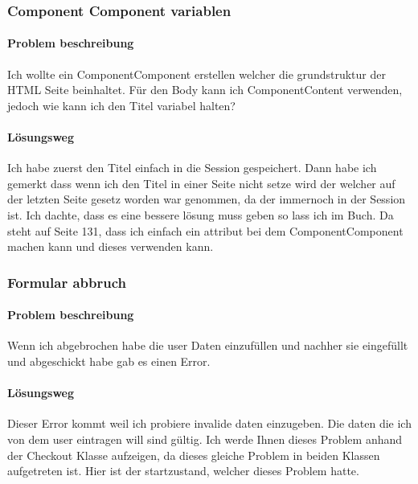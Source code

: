 \documentclass[a4paper, 11pt]{article}
\begin{document}
\subsubsection{Component Component variablen}

\paragraph{Problem beschreibung}

Ich wollte ein ComponentComponent erstellen welcher die grundstruktur der HTML Seite beinhaltet.
Für den Body kann ich ComponentContent verwenden, jedoch wie kann ich den Titel variabel halten?

\paragraph{Lösungsweg}

Ich habe zuerst den Titel einfach in die Session gespeichert.
Dann habe ich gemerkt dass wenn ich den Titel in einer Seite nicht setze wird der welcher auf der letzten Seite gesetz worden war genommen, da der immernoch in der Session ist.
Ich dachte, dass es eine bessere lösung muss geben so lass ich im Buch\cite{Learning_the_Wonders}.
Da steht auf Seite 131, dass ich einfach ein attribut bei dem ComponentComponent machen kann und dieses verwenden kann.

\subsubsection{Formular abbruch}

\paragraph{Problem beschreibung}

Wenn ich abgebrochen habe die user Daten einzufüllen und nachher sie eingefüllt und abgeschickt habe gab es einen Error.

\paragraph{Lösungsweg}

Dieser Error kommt weil ich probiere invalide daten einzugeben.
Die daten die ich von dem user eintragen will sind gültig.
Ich werde Ihnen dieses Problem anhand der Checkout Klasse aufzeigen, da dieses gleiche Problem in beiden Klassen aufgetreten ist.
Hier ist der startzustand, welcher dieses Problem hatte.
\end{document}
